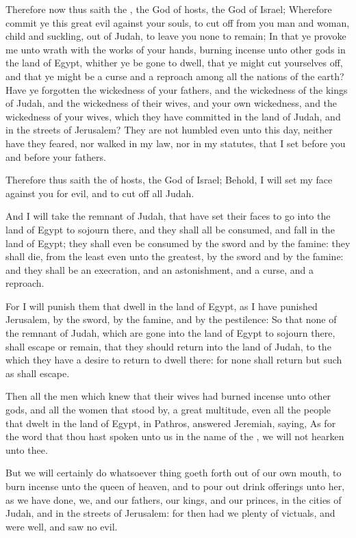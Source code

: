 \Verse Therefore now thus saith the \LORD, the God of hosts, the God of Israel; Wherefore commit ye this great evil against your souls, to cut off from you man and woman, child and suckling, out of Judah, to leave you none to remain; \Verse In that ye provoke me unto wrath with the works of your hands, burning incense unto other gods in the land of Egypt, whither ye be gone to dwell, that ye might cut yourselves off, and that ye might be a curse and a reproach among all the nations of the earth?  \Verse Have ye forgotten the wickedness of your fathers, and the wickedness of the kings of Judah, and the wickedness of their wives, and your own wickedness, and the wickedness of your wives, which they have committed in the land of Judah, and in the streets of Jerusalem?  \Verse They are not humbled even unto this day, neither have they feared, nor walked in my law, nor in my statutes, that I set before you and before your fathers.

\Verse Therefore thus saith the \LORD of hosts, the God of Israel; Behold, I will set my face against you for evil, and to cut off all Judah.

\Verse And I will take the remnant of Judah, that have set their faces to go into the land of Egypt to sojourn there, and they shall all be consumed, and fall in the land of Egypt; they shall even be consumed by the sword and by the famine: they shall die, from the least even unto the greatest, by the sword and by the famine: and they shall be an execration, and an astonishment, and a curse, and a reproach.

\Verse For I will punish them that dwell in the land of Egypt, as I have punished Jerusalem, by the sword, by the famine, and by the pestilence: \Verse So that none of the remnant of Judah, which are gone into the land of Egypt to sojourn there, shall escape or remain, that they should return into the land of Judah, to the which they have a desire to return to dwell there: for none shall return but such as shall escape.

\Verse Then all the men which knew that their wives had burned incense unto other gods, and all the women that stood by, a great multitude, even all the people that dwelt in the land of Egypt, in Pathros, answered Jeremiah, saying, \Verse As for the word that thou hast spoken unto us in the name of the \LORD, we will not hearken unto thee.

\Verse But we will certainly do whatsoever thing goeth forth out of our own mouth, to burn incense unto the queen of heaven, and to pour out drink offerings unto her, as we have done, we, and our fathers, our kings, and our princes, in the cities of Judah, and in the streets of Jerusalem: for then had we plenty of victuals, and were well, and saw no evil.

